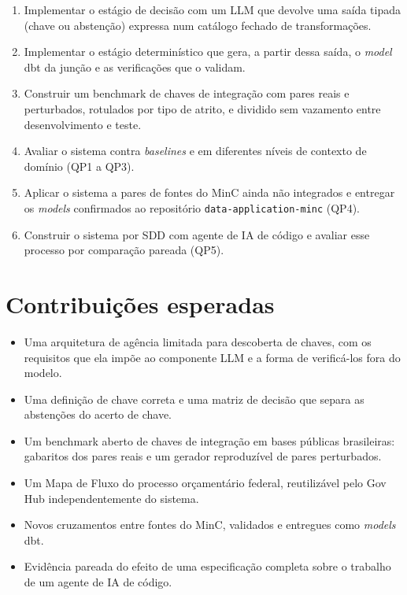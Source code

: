 \begin{enumerate}
\item Implementar o estágio de decisão com um LLM que devolve uma saída
tipada (chave ou abstenção) expressa num catálogo fechado de transformações.
\item Implementar o estágio determinístico que gera, a partir dessa saída, o
\emph{model} dbt da junção e as verificações que o validam.
\item Construir um benchmark de chaves de integração com pares reais e
perturbados, rotulados por tipo de atrito, e dividido sem vazamento entre
desenvolvimento e teste.
\item Avaliar o sistema contra \emph{baselines} e em diferentes níveis de
contexto de domínio (QP1 a QP3).
\item Aplicar o sistema a pares de fontes do MinC ainda não integrados e
entregar os \emph{models} confirmados ao repositório
\texttt{data-application-minc} (QP4).
\item Construir o sistema por SDD com agente de IA de código e avaliar esse
processo por comparação pareada (QP5).
\end{enumerate}

\section{Contribuições esperadas}
\label{sec:introducao-contribuicoes-esperadas}

\begin{itemize}
\item Uma arquitetura de agência limitada para descoberta de chaves, com os
requisitos que ela impõe ao componente LLM e a forma de verificá-los fora do
modelo.
\item Uma definição de chave correta e uma matriz de decisão que separa as
abstenções do acerto de chave.
\item Um benchmark aberto de chaves de integração em bases públicas
brasileiras: gabaritos dos pares reais e um gerador reproduzível de pares
perturbados.
\item Um Mapa de Fluxo do processo orçamentário federal, reutilizável pelo
Gov Hub independentemente do sistema.
\item Novos cruzamentos entre fontes do MinC, validados e entregues como
\emph{models} dbt.
\item Evidência pareada do efeito de uma especificação completa sobre o
trabalho de um agente de IA de código.
\end{itemize}

